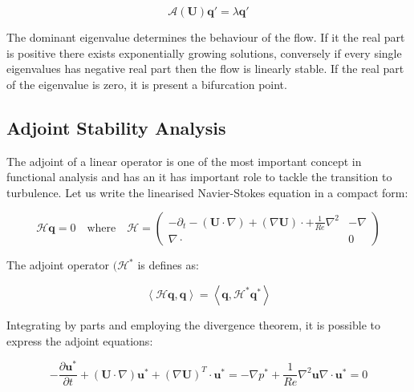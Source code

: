 \begin{equation}
   \mathcal{A}(\mathbf{U})\mathbf{q'}=\lambda \mathbf{q'}
\end{equation}

The dominant eigenvalue determines the behaviour of the flow. If it the real part is positive there exists exponentially growing solutions, conversely if every single eigenvalues has negative real part then the flow is linearly stable. If the real part of the eigenvalue is zero, it is present a bifurcation point.

\subsection{Adjoint Stability Analysis}

The adjoint of a linear operator is one of the most important concept in functional analysis and has an it has important role to tackle the transition to turbulence. Let us write the linearised Navier-Stokes equation in a compact form:

\begin{equation}
\mathcal{H}\mathbf{q}=0 \quad \mbox{where} \quad \mathcal{H}=\left( \begin{array}{c|c}
  -\partial_t-(\mathbf{U} \cdot \nabla)+ (\nabla \mathbf{U}) \cdot + \frac{1}{Re} \nabla^2 & -\nabla \\
  \hline
  \nabla \cdot  & 0
   \end{array}
 \right)
 \end{equation}
 
 
The adjoint operator $(\mathcal{H}^*$ is defines as:

\begin{equation}
\left \langle \mathcal{H}\mathbf{q}, \mathbf{q} \right \rangle= \left \langle \mathbf{q}, \mathcal{H}^*\mathbf{q}^* \right \rangle
\end{equation}

Integrating by parts and employing the divergence theorem, it is possible to express the adjoint equations:

\begin{subequations}
\begin{equation}
-\frac{\partial \mathbf{u}^*}{\partial t}+(\mathbf{U} \cdot \nabla)\mathbf{u}^*+(\nabla \mathbf{U})^T \cdot \mathbf{u}^*=-\nabla p^*+\frac{1}{Re} \nabla^2 \mathbf{u}
\end{equation}

\begin{equation}
\nabla \cdot \mathbf{u}^*=0
\end{equation}
\end{subequations}

